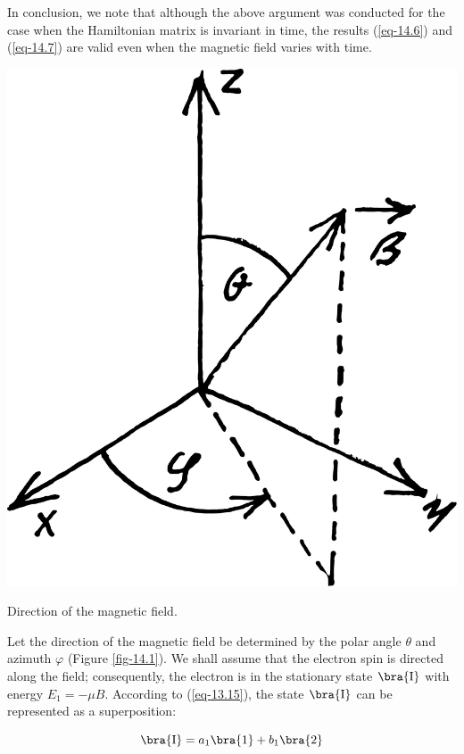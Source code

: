 \documentclass[a4paper,sfsidenotes,colorlinks=true]{tufte-book}
\numberwithin{equation}{section}
\numberwithin{figure}{section}
\begin{document}
In conclusion, we note that although the above argument was conducted
for the case when the Hamiltonian matrix is invariant in time, the
results (\ref{eq-14.6}) and (\ref{eq-14.7}) are valid even when the
magnetic field varies with time. 

\begin{marginfigure}%
\centering
\includegraphics[width=\textwidth]{figures/fig-14-01.pdf}
\caption{Direction of the magnetic field.}
\label{fig-14.1}
\end{marginfigure}

Let the direction of the magnetic
field be determined by the polar angle $\theta$ and azimuth $\varphi$
(Figure \ref{fig-14.1}). We shall assume that the electron spin is
directed along the field; consequently, the electron is in the
stationary state $\bra{\mathrm{I}}$ with energy $E_{1} = - \mu B$. According to (\ref{eq-13.15}), the state $\bra{\mathrm{I}}$ can be represented as a superposition:

\begin{equation}%
\bra{\mathrm{I}} = a_{1} \bra{1} + b_{1} \bra{2}
\label{eq-14.8}
\end{equation}
\end{document}
